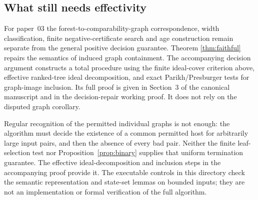 \documentclass[11pt]{article}
\begin{document}
\subsection*{What still needs effectivity}
For paper~03 the forest-to-comparability-graph correspondence, width
classification, finite negative-certificate search and age construction
remain separate from the general positive decision guarantee. Theorem
\ref{thm:faithful} repairs the semantics of induced graph containment.
The accompanying decision argument constructs a total procedure using the
finite ideal-cover criterion above, effective ranked-tree ideal decomposition,
and exact Parikh/Presburger tests for graph-image inclusion. Its full proof
is given in Section~3 of the canonical manuscript and in the decision-repair
working proof. It does not rely on the disputed graph corollary.

Regular recognition of the permitted individual graphs is not enough:
the algorithm must decide the existence of a common permitted host for
arbitrarily large input pairs, and then the absence of every bad pair.
Neither the finite leaf-selection test nor
Proposition~\ref{prop:binary} supplies that uniform termination guarantee.
The effective ideal-decomposition and inclusion steps in the accompanying
proof provide it. The executable controls in this directory check the
semantic representation and state-set lemmas on bounded inputs; they are
not an implementation or formal verification of the full algorithm.
\end{document}
